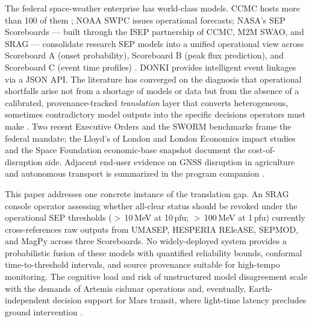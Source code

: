 \documentclass[11pt,letterpaper]{article}
\begin{document}
The federal space-weather enterprise has world-class models.
CCMC hosts more than 100 of them \cite{ccmc}; NOAA SWPC issues operational
forecasts; NASA's SEP Scoreboards --- built through the ISEP partnership of
CCMC, M2M SWAO, and SRAG --- consolidate research SEP models into a unified
operational view across Scoreboard A (onset probability), Scoreboard B (peak
flux prediction), and Scoreboard C (event time profiles)
\cite{sepscoreboard,whitman2023,whitman2024}.  DONKI \cite{donki} provides
intelligent event linkages via a JSON API.  The literature has converged on
the diagnosis that operational shortfalls arise not from a shortage of
models or data but from the absence of a calibrated, provenance-tracked
\emph{translation} layer that converts heterogeneous, sometimes contradictory
model outputs into the specific decisions operators must make
\cite{swag2023,hapgood2023,r2o2r2022,decadal2025,proswift2020,nstc2019,benchmarks2018}.
Two recent Executive Orders \cite{eo13744,eo13865} and the SWORM
benchmarks \cite{benchmarks2018} frame the federal mandate; the
Lloyd's of London and London Economics impact studies
\cite{lloyds2013,londecon2017} and the Space Foundation
economic-base snapshot \cite{spacereport2025} document the cost-of-disruption
side.  Adjacent end-user evidence on GNSS disruption in agriculture
\cite{ntrs_brazil2025,seesaw2022,osuext2024,afbf2024,starion2024} and
autonomous transport \cite{sae2020} is summarized in the program companion
\cite{helios_program}.

This paper addresses one concrete instance of the translation gap.  An SRAG
console operator assessing whether all-clear status should be revoked
under the operational SEP thresholds ($>$\,10\,MeV at 10\,pfu;
$>$\,100\,MeV at 1\,pfu) currently cross-references raw outputs from
UMASEP, HESPERIA REleASE, SEPMOD, and MagPy across three Scoreboards.  No
widely-deployed system provides a probabilistic fusion of these models with
quantified reliability bounds, conformal time-to-threshold intervals, and
source provenance suitable for high-tempo monitoring.  The cognitive load and
risk of unstructured model disagreement scale with the demands of Artemis
cislunar operations and, eventually, Earth-independent decision support for
Mars transit, where light-time latency precludes ground intervention
\cite{decadal2025}.
\end{document}
